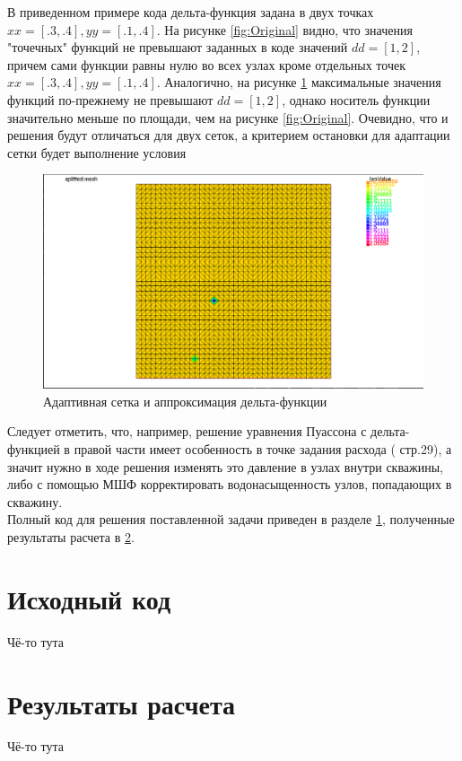 В приведенном примере кода дельта-функция задана в двух точках $xx = [.3, .4], yy = [.1, .4]$.
На рисунке \ref{fig:Original} видно, что значения "точечных" функций не превышают
заданных в коде значений $dd = [1, 2]$, причем сами функции равны нулю во всех узлах кроме
отдельных точек $xx = [.3, .4], yy = [.1, .4]$.
Аналогично, на рисунке \ref{fig:Split} максимальные значения функций по-прежнему не превышают
$dd = [1, 2]$, однако носитель функции значительно меньше по площади, чем на рисунке \ref{fig:Original}.
Очевидно, что и решения будут отличаться для двух сеток, а критерием остановки для адаптации сетки будет 
выполнение условия  
\begin{figure}[H]
	\centering
	\includegraphics[width=0.7\linewidth]{img/splitMesh.png}
	\caption{Адаптивная сетка и аппроксимация дельта-функции}
	\label{fig:Split}
\end{figure}
Следует отметить, что, например, решение уравнения Пуассона с дельта-функцией в правой части имеет 
особенность в точке задания расхода (\cite{Hunt} стр.29), а значит нужно в ходе решения изменять это 
давление в узлах внутри скважины, либо с помощью МШФ корректировать водонасыщенность узлов, попадающих 
в скважину.\\
Полный код для решения поставленной задачи приведен в разделе \ref{appendix:App1}, полученные результаты расчета в 
\ref{appendix:App2}.

\newpage
\begin{appendices}
	\section{Исходный код}\label{appendix:App1}
	Чё-то тута
	\newpage
	\section{Результаты расчета}\label{appendix:App2}
		Чё-то тута
	\end{appendices}

\newpage




